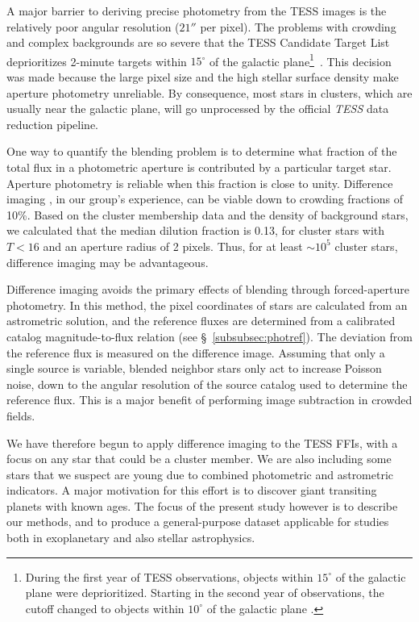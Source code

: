 \documentclass[12pt,twocolumn,tighten]{aastex62}
\begin{document}
A major barrier to deriving precise photometry from the TESS images is
the relatively poor angular resolution ($21''$ per pixel).   The
problems with crowding and complex backgrounds are so severe that the
TESS Candidate Target List deprioritizes 2-minute targets within
$15^\circ$ of the galactic plane\footnote{During the first year of
TESS observations, objects within $15^\circ$ of the galactic plane
were deprioritized. Starting in the second year of observations, the
cutoff changed to objects within $10^\circ$ of the galactic plane
\citep{stassun_TIC8_2019}.}~\citep{stassun_TIC_2018,stassun_TIC8_2019}.
This decision was made because the large pixel size and the high
stellar surface density make aperture photometry unreliable. 
By consequence, most stars in clusters, which are usually near
the galactic plane, will go unprocessed by the official {\it TESS}
data reduction pipeline.

One way to quantify the blending problem is to determine what fraction
of the total flux in a photometric aperture is contributed by a
particular target star. Aperture photometry is reliable when this
fraction is close to unity.  Difference imaging
\citep{Alard_Lupton_1998,miller_optimal_2008}, in our group's
experience, can be viable down to crowding fractions of 10\%.  Based
on the \citet{Kharchenko_et_al_2013} cluster membership data and the
density of background stars, we calculated that the median dilution
fraction is 0.13, for cluster stars with $T< 16$ and an aperture
radius of 2 pixels.  Thus, for at least $\sim$$10^5$ cluster stars,
difference imaging may be advantageous.

Difference imaging avoids the primary effects of blending through
forced-aperture photometry.  In this method, the pixel coordinates of
stars are calculated from an astrometric solution, and the reference
fluxes are determined from a calibrated catalog magnitude-to-flux
relation (see \S~\ref{subsubsec:photref}).  The deviation from the
reference flux is measured on the difference image.  Assuming that
only a single source is variable, blended neighbor stars only act to
increase Poisson noise, down to the angular resolution of the source
catalog used to determine the reference flux.  This is a major benefit
of performing image subtraction in crowded fields.

We have therefore begun to apply difference imaging to the TESS
FFIs, with a focus on any star that could be a cluster member.
We are also including some stars that we suspect are young due to
combined photometric and astrometric indicators.  A major motivation
for this effort is to discover giant transiting planets with known
ages.  The focus of the present study however is to describe our
methods, and to produce a general-purpose dataset applicable for
studies both in exoplanetary and also stellar astrophysics.
\end{document}
